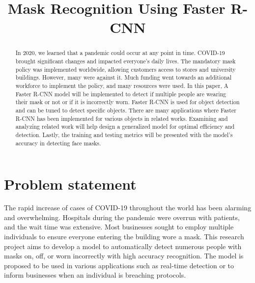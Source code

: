 \documentclass[conference]{IEEEtran}
\begin{document}
\title{Mask Recognition Using Faster R-CNN\\
}

\author{
}

\maketitle

\begin{abstract}
    In 2020, we learned that a pandemic could occur at any point in time. COVID-19 brought significant changes and impacted everyone's daily lives. 
    The mandatory mask policy was implemented worldwide, allowing customers access to stores and university buildings. However, many were against it. 
    Much funding went towards an additional workforce to implement the policy, and many resources were used. In this paper, A Faster R-CNN model 
    will be implemented to detect if multiple people are wearing their mask or not or if it is incorrectly worn. Faster R-CNN is used for object 
    detection and can be tuned to detect specific objects. There are many applications where Faster R-CNN has been implemented for various objects 
    in related works. Examining and analyzing related work will help design a generalized model for optimal efficiency and detection. Lastly, the 
    training and testing metrics will be presented with the model's accuracy in detecting face masks.
\end{abstract}


\section{Problem statement}
    The rapid increase of cases of COVID-19 throughout the world has been alarming and overwhelming. Hospitals during the pandemic were 
    overrun with patients, and the wait time was extensive. Most businesses sought to employ multiple individuals to ensure everyone 
    entering the building wore a mask. This research project aims to develop a model to automatically detect numerous people with masks 
    on, off, or worn incorrectly with high accuracy recognition. The model is proposed to be used in various applications such as real-time 
    detection or to inform businesses when an individual is breaching protocols. 
\end{document}

